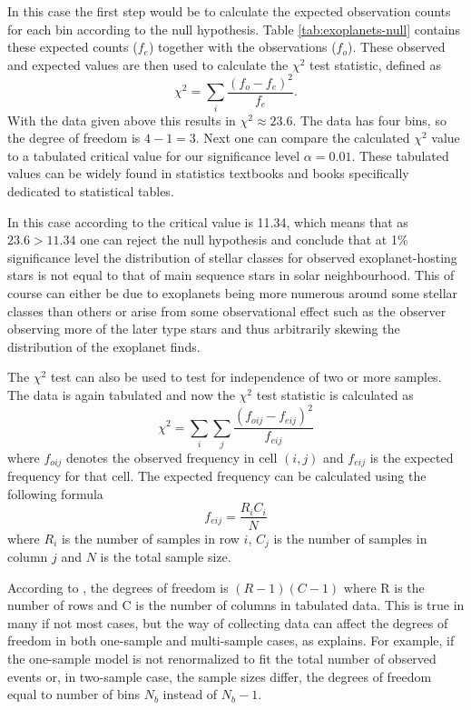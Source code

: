\documentclass[english, oneside]{HYgradu}
\begin{document}
In this case the first step would be to calculate the expected observation counts for each bin according to the null hypothesis. Table \ref{tab:exoplanets-null} contains these expected counts ($f_e$) together with the observations ($f_o$). These observed and expected values are then used to calculate the $\chi^2$ test statistic, defined as
\begin{equation}
	\chi^2 = \sum_i \frac{(f_o - f_e)^2}{f_e}.
\end{equation}
With the data given above this results in $\chi^2 \approx 23.6$. The data has four bins, so the degree of freedom is $4-1=3$. Next one can compare the calculated $\chi^2$ value to a tabulated critical value for our significance level $\alpha=0.01$. These tabulated values can be widely found in statistics textbooks and books specifically dedicated to statistical tables.

In this case according to \citet{corder2014nonparametric} the critical value is 11.34, which means that as $23.6>11.34$ one can reject the null hypothesis and conclude that at 1\% significance level the distribution of stellar classes for observed exoplanet-hosting stars is not equal to that of main sequence stars in solar neighbourhood. This of course can either be due to exoplanets being more numerous around some stellar classes than others or arise from some observational effect such as the observer observing more of the later type stars and thus arbitrarily skewing the distribution of the exoplanet finds.

The $\chi^2$ test can also be used to test for independence of two or more samples. The data is again tabulated and now the $\chi^2$ test statistic is calculated as
\begin{equation}
	\chi^2 = \sum_i \sum_j \frac{(f_{oij}-f_{eij})^2}{f_{eij}}
\end{equation}
where $f_{oij}$ denotes the observed frequency in cell $(i, j)$ and $f_{eij}$ is the expected frequency for that cell. The expected frequency can be calculated using the following formula
\begin{equation}
	f_{eij} = \frac{R_i C_i}{N}
\end{equation}
where $R_i$ is the number of samples in row $i$, $C_j$ is the number of samples in column $j$ and $N$ is the total sample size.

According to \citet{corder2014nonparametric}, the degrees of freedom is $(R-1)(C-1)$ where R is the number of rows and C is the number of columns in tabulated data. This is true in many if not most cases, but the way of collecting data can affect the degrees of freedom in both one-sample and multi-sample cases, as \cite{press2007numerical} explains. For example, if the one-sample model is not renormalized to fit the total number of observed events or, in two-sample case, the sample sizes differ, the degrees of freedom equal to number of bins $N_b$ instead of $N_b-1$.
\end{document}
